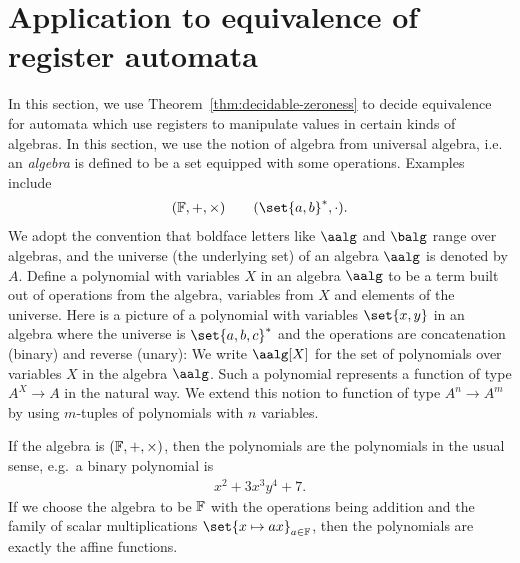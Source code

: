 \section{Application to equivalence of register automata}
\label{sec:applications-of-zeroness}
In this section, we  use Theorem~\ref{thm:decidable-zeroness} to decide equivalence for automata which use registers to manipulate values in certain kinds of algebras. In this section, we use the notion of algebra from universal algebra,
i.e.~ an \emph{algebra} is defined to  be a set equipped with some operations. Examples include
\begin{align*}
  (\definablereal, + , \times) \qquad (\set{a,b}^*, \cdot).
\end{align*}
We adopt the convention that boldface letters like $\aalg$ and $\balg$ range over algebras, and the universe (the underlying set) of an algebra $\aalg$ is denoted by $A$.
Define a  polynomial with variables $X$  in an algebra $\aalg$ to be a term built out of operations from the algebra, variables from $X$  and elements of the universe. Here is a picture of a polynomial with variables $\set{x,y}$ in an algebra where the universe is $\set{a,b,c}^*$ and the operations are concatenation (binary) and reverse (unary):
We write $\aalg[X]$ for the set of polynomials over variables $X$ in the algebra $\aalg$. Such a polynomial represents a function of type $A^X \to A$ in the natural way. We extend this notion to function of type $A^n \to A^m$ by using $m$-tuples of polynomials with $n$ variables.

\begin{example}
	If the algebra is $(\mathbb F, + ,\times)$, then the polynomials are the polynomials in the usual sense, e.g.~a binary polynomial is
	\begin{align*}
x^2 + 3x^3 y^4  + 7.
\end{align*}
If we choose the algebra to be $\mathbb F$ with the operations being addition and the family of scalar multiplications $\set{x \mapsto ax}_{a \in \definablereal}$, then the polynomials are exactly the affine functions.
\end{example}

